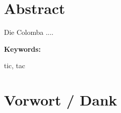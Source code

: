 \section*{Abstract}
Die Colomba ....

\vspace{2ex}

\textbf{Keywords:}

tic, tac

\clearpage

\section*{Vorwort / Dank}


